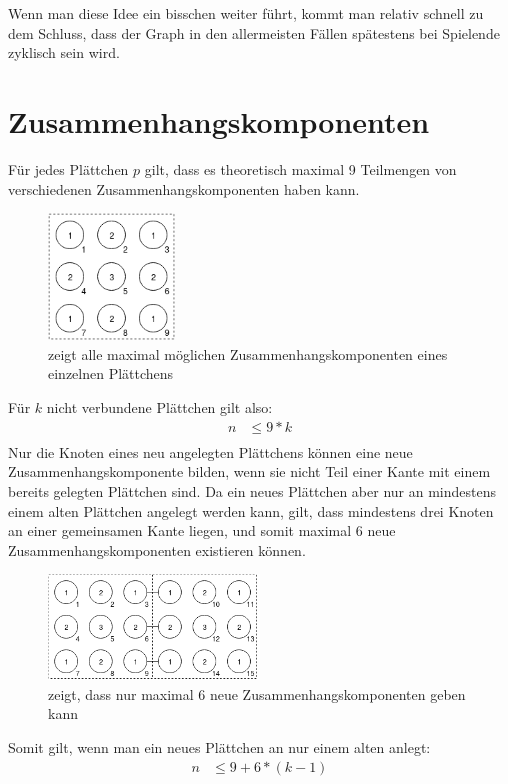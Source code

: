 \documentclass{article}
\begin{document}
Wenn man diese Idee ein bisschen weiter f\"uhrt, kommt man relativ schnell zu dem Schluss, dass der Graph in den allermeisten F\"allen sp\"atestens bei Spielende zyklisch sein wird.

\section{Zusammenhangskomponenten}
F\"ur jedes Pl\"attchen $p$ gilt, dass es theoretisch maximal 9 Teilmengen von verschiedenen Zusammenhangskomponenten haben kann.
\begin{figure}[H]
	\centering
	\includegraphics[width=0.3\textwidth]{aufgabe2_0.png}
	\caption{zeigt alle maximal m\"oglichen Zusammenhangskomponenten eines einzelnen Pl\"attchens}
\end{figure}
F\"ur $k$ nicht verbundene Pl\"attchen gilt also:
\begin{align*}
n &\leq 9 * k\\
\end{align*}
Nur die Knoten eines neu angelegten Pl\"attchens k\"onnen eine neue Zusammenhangskomponente bilden, wenn sie nicht Teil einer Kante mit einem bereits gelegten Pl\"attchen sind. Da ein neues Pl\"attchen aber nur an mindestens einem alten Pl\"attchen angelegt werden kann, gilt, dass mindestens drei Knoten an einer gemeinsamen Kante liegen, und somit maximal 6 neue Zusammenhangskomponenten existieren k\"onnen. 
\begin{figure}[H]
	\centering
	\includegraphics[width=0.5\textwidth]{aufgabe2_1.png}
	\caption{zeigt, dass nur maximal 6 neue Zusammenhangskomponenten geben kann}
\end{figure}
Somit gilt, wenn man ein neues Pl\"attchen an nur einem alten anlegt:
\begin{align*}
n &\leq 9 + 6*(k-1)
\end{align*}
\end{document}
